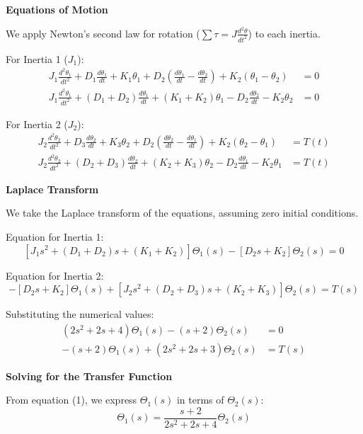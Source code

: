 \documentclass[11pt]{article}
\begin{document}
\noindent\textbf{Equations of Motion}
\vspace{8pt}

\noindent We apply Newton's second law for rotation ($\sum \tau = J \frac{d^2\theta}{dt^2}$) to each inertia.

\vspace{5pt}
{For Inertia 1 ($J_1$):}
\begin{align*}
    J_1 \frac{d^2\theta_1}{dt^2} + D_1 \frac{d\theta_1}{dt} + K_1 \theta_1 + D_2\left(\frac{d\theta_1}{dt} - \frac{d\theta_2}{dt}\right) + K_2(\theta_1 - \theta_2) &= 0 \\
    J_1 \frac{d^2\theta_1}{dt^2} + (D_1 + D_2)\frac{d\theta_1}{dt} + (K_1 + K_2)\theta_1 - D_2\frac{d\theta_2}{dt} - K_2\theta_2 &= 0
\end{align*}

{For Inertia 2 ($J_2$):}
\begin{align*}
    J_2 \frac{d^2\theta_2}{dt^2} + D_3 \frac{d\theta_2}{dt} + K_3 \theta_2 + D_2\left(\frac{d\theta_2}{dt} - \frac{d\theta_1}{dt}\right) + K_2(\theta_2 - \theta_1) &= T(t) \\
    J_2 \frac{d^2\theta_2}{dt^2} + (D_2 + D_3)\frac{d\theta_2}{dt} + (K_2 + K_3)\theta_2 - D_2\frac{d\theta_1}{dt} - K_2\theta_1 &= T(t)
\end{align*}

\newpage
\noindent\textbf{Laplace Transform}
\vspace{12pt}

We take the Laplace transform of the equations, assuming zero initial conditions.

Equation for Inertia 1:
\[
[J_1 s^2 + (D_1 + D_2)s + (K_1 + K_2)]\Theta_1(s) - [D_2s + K_2]\Theta_2(s) = 0
\]

Equation for Inertia 2:
\[
-[D_2s + K_2]\Theta_1(s) + [J_2 s^2 + (D_2 + D_3)s + (K_2 + K_3)]\Theta_2(s) = T(s)
\]

Substituting the numerical values:
\begin{align}
    (2s^2 + 2s + 4)\Theta_1(s) - (s + 2)\Theta_2(s) &= 0 \tag{1} \\
    -(s + 2)\Theta_1(s) + (2s^2 + 2s + 3)\Theta_2(s) &= T(s) \tag{2}
\end{align}

\noindent\textbf{Solving for the Transfer Function}
\vspace{8pt}

From equation (1), we express $\Theta_1(s)$ in terms of $\Theta_2(s)$:
\[
\Theta_1(s) = \frac{s + 2}{2s^2 + 2s + 4} \Theta_2(s)
\]
\end{document}
